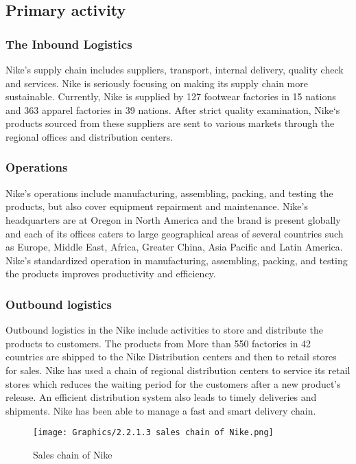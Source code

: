 \documentclass[a4paper, 12pt]{report}
\begin{document}
\subsection{Primary activity}
\subsubsection{The Inbound Logistics}
Nike’s supply chain includes suppliers, transport, internal delivery, quality check and services. Nike is seriously focusing on making its supply chain more sustainable. Currently, Nike is supplied by 127 footwear factories in 15 nations and 363 apparel factories in 39 nations. After strict quality examination, Nike‘s products sourced from these suppliers are sent to various markets through the regional offices and distribution centers.
\subsubsection{Operations}
Nike’s operations include manufacturing, assembling, packing, and testing the products, but also cover equipment repairment and maintenance. Nike's headquarters are at Oregon in North America and the brand is present globally and each of its offices caters to large geographical areas of several countries such as Europe, Middle East, Africa, Greater China, Asia Pacific and Latin America. Nike’s standardized operation in manufacturing, assembling, packing, and testing the products improves productivity and efficiency.
\subsubsection{Outbound logistics}
Outbound logistics in the Nike include activities to store and distribute the products to customers. The products from More than 550 factories in 42 countries are shipped to the Nike Distribution centers and then to retail stores for sales. Nike has used a chain of regional distribution centers to service its retail stores which reduces the waiting period for the customers after a new product's release. An efficient distribution system also leads to timely deliveries and shipments. Nike has been able to manage a fast and smart delivery chain.
 \begin{figure}[ht]
 			\begin{center}
				\texttt{[image: Graphics/2.2.1.3 sales chain of Nike.png]}
			\end{center}
       		\caption{\label{2.2.1.3}Sales chain of Nike}
 \end{figure}
\end{document}
